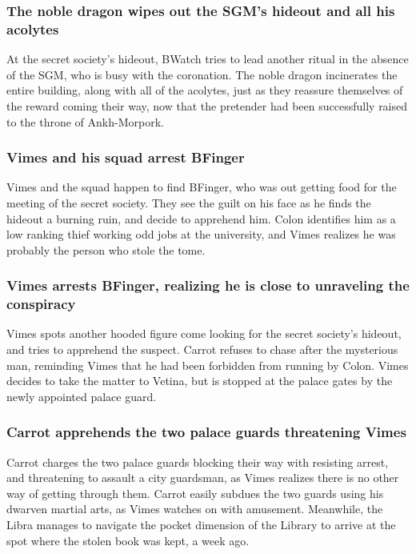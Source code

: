 \subsubsection{The noble dragon wipes out the \Gls{SGM}'s hideout and all his acolytes}
At the secret society's hideout, \Gls{BWatch} tries to lead another ritual in the absence of the
\Gls{SGM}, who is busy with the coronation. The noble dragon incinerates the entire building, along
with all of the acolytes, just as they reassure themselves of the reward coming their way, now that
the pretender had been successfully raised to the throne of Ankh-Morpork.

\subsubsection{\Gls{Vimes} and his squad arrest \Gls{BFinger}}
\Gls{Vimes} and the squad happen to find \Gls{BFinger}, who was out getting food for the meeting of
the secret society. They see the guilt on his face as he finds the hideout a burning ruin, and
decide to apprehend him. \Gls{Colon} identifies him as a low ranking thief working odd jobs at the
university, and \Gls{Vimes} realizes he was probably the person who stole the tome.

\subsubsection{\Gls{Vimes} arrests \Gls{BFinger}, realizing he is close to unraveling the
    conspiracy}
\Gls{Vimes} spots another hooded figure come looking for the secret society's hideout, and tries to
apprehend the suspect. \Gls{Carrot} refuses to chase after the mysterious man, reminding \Gls{Vimes}
that he had been forbidden from running by \Gls{Colon}. \Gls{Vimes} decides to take the matter to
\Gls{Vetina}, but is stopped at the palace gates by the newly appointed palace guard.

\subsubsection{\Gls{Carrot} apprehends the two palace guards threatening \Gls{Vimes}}
\Gls{Carrot} charges the two palace guards blocking their way with resisting arrest, and threatening
to assault a city guardsman, as \Gls{Vimes} realizes there is no other way of getting through them.
\Gls{Carrot} easily subdues the two guards using his dwarven martial arts, as \Gls{Vimes} watches
on with amusement. Meanwhile, the \Gls{Libra} manages to navigate the pocket dimension of the
Library to arrive at the spot where the stolen book was kept, a week ago.

